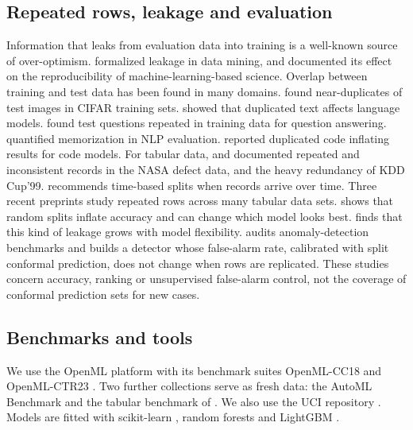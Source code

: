 \subsection{Repeated rows, leakage and evaluation}
Information that leaks from evaluation data into training is a well-known source of over-optimism. \citet{kaufman2012} formalized leakage in data mining, and \citet{kapoor2023} documented its effect on the reproducibility of machine-learning-based science. Overlap between training and test data has been found in many domains. \citet{barz2020} found near-duplicates of test images in CIFAR training sets. \citet{lee2022} showed that duplicated text affects language models. \citet{lewis2021} found test questions repeated in training data for question answering. \citet{elangovan2021} quantified memorization in NLP evaluation. \citet{allamanis2019} reported duplicated code inflating results for code models. For tabular data, \citet{gray2011} and \citet{shepperd2013} documented repeated and inconsistent records in the NASA defect data, and \citet{tavallaee2009} the heavy redundancy of KDD Cup'99. \citet{sheridan2013} recommends time-based splits when records arrive over time. Three recent preprints study repeated rows across many tabular data sets. \citet{li2026} shows that random splits inflate accuracy and can change which model looks best. \citet{roth2026} finds that this kind of leakage grows with model flexibility. \citet{deng2026} audits anomaly-detection benchmarks and builds a detector whose false-alarm rate, calibrated with split conformal prediction, does not change when rows are replicated. These studies concern accuracy, ranking or unsupervised false-alarm control, not the coverage of conformal prediction sets for new cases.

\subsection{Benchmarks and tools}
We use the OpenML platform \citep{vanschoren2014} with its benchmark suites OpenML-CC18 \citep{bischl2021} and OpenML-CTR23 \citep{fischer2023}. Two further collections serve as fresh data: the AutoML Benchmark \citep{gijsbers2024} and the tabular benchmark of \citet{grinsztajn2022}. We also use the UCI repository \citep{kelly_uci}. Models are fitted with scikit-learn \citep{pedregosa2011}, random forests \citep{breiman2001} and LightGBM \citep{ke2017}.

